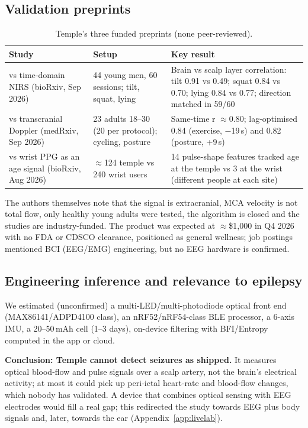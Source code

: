 \subsection{Validation preprints}

\begin{table}[H]
\centering\small
\caption{Temple's three funded preprints (none peer-reviewed).}
\begin{tabularx}{\linewidth}{@{}L L L@{}}
\toprule
Study & Setup & Key result \\
\midrule
vs time-domain NIRS (bioRxiv, Sep 2026) & 44 young men, 60 sessions; tilt, squat, lying & Brain vs scalp layer correlation: tilt 0.91 vs 0.49; squat 0.84 vs 0.70; lying 0.84 vs 0.77; direction matched in 59/60 \\
vs transcranial Doppler (medRxiv, Sep 2026) & 23 adults 18--30 (20 per protocol); cycling, posture & Same-time r $\approx$0.80; lag-optimised 0.84 (exercise, $-$19\,s) and 0.82 (posture, +9\,s) \\
vs wrist PPG as an age signal (bioRxiv, Aug 2026) & $\approx$124 temple vs 240 wrist users & 14 pulse-shape features tracked age at the temple vs 3 at the wrist (different people at each site) \\
\bottomrule
\end{tabularx}
\end{table}

The authors themselves note that the signal is extracranial, MCA velocity is not total flow, only healthy young adults were tested, the algorithm is closed and the studies are industry-funded. The product was expected at $\approx$\$1,000 in Q4 2026 with no FDA or CDSCO clearance, positioned as general wellness; job postings mentioned BCI (EEG/EMG) engineering, but no EEG hardware is confirmed.

\subsection{Engineering inference and relevance to epilepsy}

We estimated (unconfirmed) a multi-LED/multi-photodiode optical front end (MAX86141/ADPD4100 class), an nRF52/nRF54-class BLE processor, a 6-axis IMU, a 20--50\,mAh cell (1--3 days), on-device filtering with BFI/Entropy computed in the app or cloud.

\textbf{Conclusion: Temple cannot detect seizures as shipped.} It measures optical blood-flow and pulse signals over a scalp artery, not the brain's electrical activity; at most it could pick up peri-ictal heart-rate and blood-flow changes, which nobody has validated. A device that combines optical sensing with EEG electrodes would fill a real gap; this redirected the study towards EEG plus body signals and, later, towards the ear (Appendix~\ref{app:livelab}).
